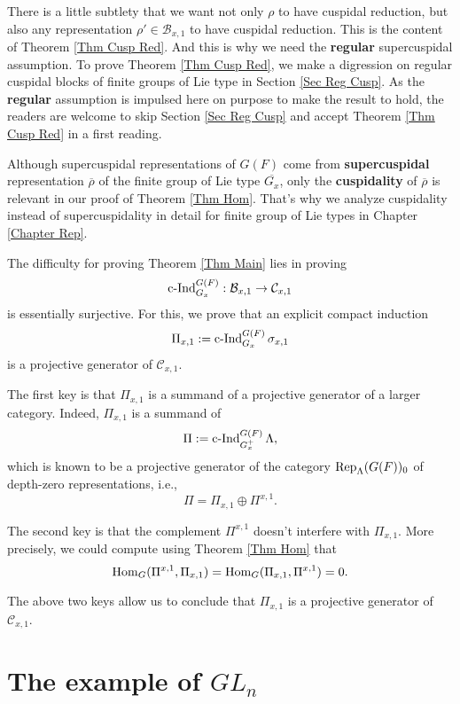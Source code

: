 There is a little subtlety that we want not only $\rho$ to have cuspidal reduction, but also any representation $\rho' \in \mathcal{B}_{x,1}$ to have cuspidal reduction. This is the content of Theorem \ref{Thm Cusp Red}. And this is why we need the \textbf{regular} supercuspidal assumption. To prove Theorem \ref{Thm Cusp Red}, we make a digression on regular cuspidal blocks of finite groups of Lie type in Section \ref{Sec Reg Cusp}. As the \textbf{regular} assumption is impulsed here on purpose to make the result to hold, the readers are welcome to skip Section \ref{Sec Reg Cusp} and accept Theorem \ref{Thm Cusp Red} in a first reading.

\begin{remark}
	Although supercuspidal representations of $G(F)$ come from \textbf{supercuspidal} representation $\overline{\rho}$ of the finite group of Lie type $\overline{G_x}$, only the \textbf{cuspidality} of $\overline{\rho}$ is relevant in our proof of Theorem \ref{Thm Hom}. That's why we analyze cuspidality instead of supercuspidality in detail for finite group of Lie types in Chapter \ref{Chapter Rep}.
\end{remark}

The difficulty for proving Theorem \ref{Thm Main} lies in proving
$$\operatorname{\operatorname{c-Ind}}_{G_x}^{G(F)}: \mathcal{B}_{x,1} \to \mathcal{C}_{x,1}$$
is essentially surjective. For this, we prove that an explicit compact induction $$\Pi_{x,1}:=\operatorname{\operatorname{c-Ind}}_{G_x}^{G(F)}\sigma_{x,1}$$ 
is a projective generator of $\mathcal{C}_{x,1}$. 

The first key is that $\Pi_{x,1}$ is a summand of a projective generator of a larger category. Indeed, $\Pi_{x,1}$ is a summand of
$$\Pi:=\operatorname{\operatorname{c-Ind}}_{G_x^+}^{G(F)}\Lambda,$$
which is known to be a projective generator of the category $\operatorname{\operatorname{Rep}}_{\Lambda}(G(F))_0$ of depth-zero representations, i.e., 
$$\Pi=\Pi_{x,1} \oplus \Pi^{x,1}.$$

The second key is that the complement $\Pi^{x,1}$ doesn't interfere with $\Pi_{x,1}$. More precisely, we could compute using Theorem \ref{Thm Hom} that 
$$\operatorname{\operatorname{Hom}}_{G}(\Pi^{x,1}, \Pi_{x,1})=\operatorname{\operatorname{Hom}}_{G}(\Pi_{x,1}, \Pi^{x,1})=0.$$

The above two keys allow us to conclude that $\Pi_{x,1}$ is a projective generator of $\mathcal{C}_{x,1}$. 




\section{The example of $GL_n$}

